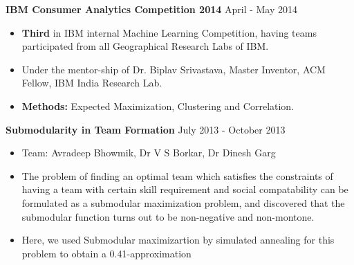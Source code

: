 \documentclass[margin,line]{res}
\begin{document}
\begin{resume}
{\bf IBM Consumer Analytics Competition 2014} \hfill {April - May 2014}
\begin{itemize} %
  \setlength{\itemsep}{0.01pt}
  \setlength{\parskip}{0pt}
  \setlength{\parsep}{0pt}
  \item {\bf Third} in IBM internal Machine Learning Competition, having teams participated from all Geographical Research Labs of IBM. 
  \item Under the mentor-ship of Dr. Biplav Srivastava, Master Inventor, ACM Fellow, IBM India Research Lab.
  \item {\bf Methods:} Expected Maximization, Clustering and Correlation.
\end{itemize}
\vspace{0.8 mm}
{\bf Submodularity in Team Formation} \hfill {July 2013 - October 2013}
\begin{itemize} %
  \setlength{\itemsep}{0.01pt}
  \setlength{\parskip}{0pt}
  \setlength{\parsep}{0pt}
\item Team: Avradeep Bhowmik, Dr V S Borkar, Dr Dinesh Garg
\item The problem of finding an optimal team which satisfies the constraints of having a team with certain skill requirement and social compatability can be formulated as a 
submodular maximization problem, and discovered that the submodular function turns out to be non-negative and non-montone.
\item Here, we used Submodular maximizartion by simulated annealing for this problem to obtain a 0.41-approximation

\end{itemize}
\end{resume}
\end{document}
